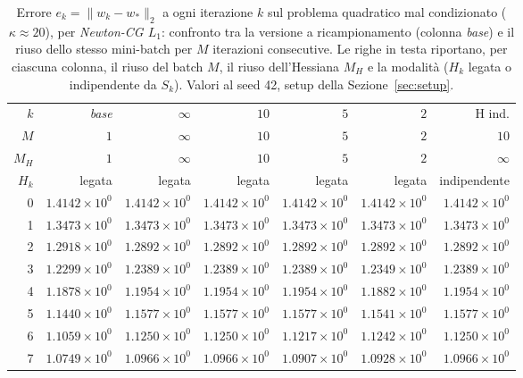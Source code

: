 \begin{table}[H]
\centering
\footnotesize
\renewcommand{\arraystretch}{0.85}
\setlength{\tabcolsep}{2pt}
\caption{Errore $e_k=\|w_k-w_*\|_2$ a ogni iterazione $k$ sul problema quadratico mal condizionato ($\kappa\approx 20$), per \emph{Newton-CG $L_1$}: confronto tra la versione a ricampionamento (colonna \emph{base}) e il riuso dello stesso mini-batch per $M$ iterazioni consecutive. Le righe in testa riportano, per ciascuna colonna, il riuso del batch $M$, il riuso dell'Hessiana $M_H$ e la modalità ($H_k$ legata o indipendente da $S_k$). Valori al seed 42, setup della Sezione~\ref{sec:setup}.}
\label{tab:riuso_malcond_l1}
\begin{tabular}{@{}rrrrrrr@{}}
\toprule
$k$ & \emph{base} & $\infty$ & $10$ & $5$ & $2$ & H ind.\\
$M$ & $1$ & $\infty$ & $10$ & $5$ & $2$ & $10$\\
$M_H$ & $1$ & $\infty$ & $10$ & $5$ & $2$ & $\infty$\\
$H_k$ & legata & legata & legata & legata & legata & indipendente\\
\midrule
0 & $1.4142\times10^{0}$ & $1.4142\times10^{0}$ & $1.4142\times10^{0}$ & $1.4142\times10^{0}$ & $1.4142\times10^{0}$ & $1.4142\times10^{0}$\\
1 & $1.3473\times10^{0}$ & $1.3473\times10^{0}$ & $1.3473\times10^{0}$ & $1.3473\times10^{0}$ & $1.3473\times10^{0}$ & $1.3473\times10^{0}$\\
2 & $1.2918\times10^{0}$ & $1.2892\times10^{0}$ & $1.2892\times10^{0}$ & $1.2892\times10^{0}$ & $1.2892\times10^{0}$ & $1.2892\times10^{0}$\\
3 & $1.2299\times10^{0}$ & $1.2389\times10^{0}$ & $1.2389\times10^{0}$ & $1.2389\times10^{0}$ & $1.2349\times10^{0}$ & $1.2389\times10^{0}$\\
4 & $1.1878\times10^{0}$ & $1.1954\times10^{0}$ & $1.1954\times10^{0}$ & $1.1954\times10^{0}$ & $1.1882\times10^{0}$ & $1.1954\times10^{0}$\\
5 & $1.1440\times10^{0}$ & $1.1577\times10^{0}$ & $1.1577\times10^{0}$ & $1.1577\times10^{0}$ & $1.1541\times10^{0}$ & $1.1577\times10^{0}$\\
6 & $1.1059\times10^{0}$ & $1.1250\times10^{0}$ & $1.1250\times10^{0}$ & $1.1217\times10^{0}$ & $1.1242\times10^{0}$ & $1.1250\times10^{0}$\\
7 & $1.0749\times10^{0}$ & $1.0966\times10^{0}$ & $1.0966\times10^{0}$ & $1.0907\times10^{0}$ & $1.0928\times10^{0}$ & $1.0966\times10^{0}$\\

\end{tabular}
\end{table}

